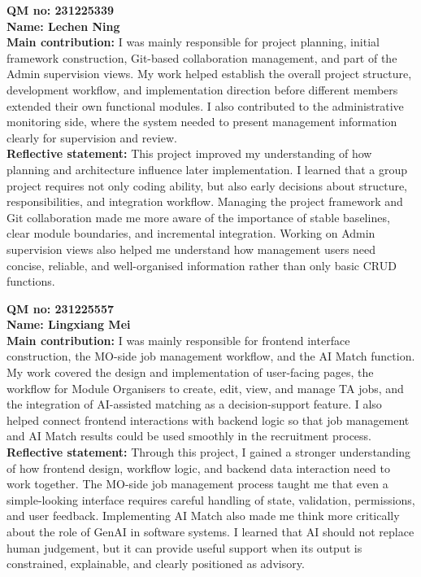 \documentclass[11pt,a4paper]{article}
\begin{document}
{\sloppy

\textbf{QM no: 231225339}\\
\textbf{Name: Lechen Ning}\\
\textbf{Main contribution:} I was mainly responsible for project planning, initial framework construction, Git-based collaboration management, and part of the Admin supervision views. My work helped establish the overall project structure, development workflow, and implementation direction before different members extended their own functional modules. I also contributed to the administrative monitoring side, where the system needed to present management information clearly for supervision and review.\\
\textbf{Reflective statement:} This project improved my understanding of how planning and architecture influence later implementation. I learned that a group project requires not only coding ability, but also early decisions about structure, responsibilities, and integration workflow. Managing the project framework and Git collaboration made me more aware of the importance of stable baselines, clear module boundaries, and incremental integration. Working on Admin supervision views also helped me understand how management users need concise, reliable, and well-organised information rather than only basic CRUD functions.

\vspace{6pt}

\textbf{QM no: 231225557}\\
\textbf{Name: Lingxiang Mei}\\
\textbf{Main contribution:} I was mainly responsible for frontend interface construction, the MO-side job management workflow, and the AI Match function. My work covered the design and implementation of user-facing pages, the workflow for Module Organisers to create, edit, view, and manage TA jobs, and the integration of AI-assisted matching as a decision-support feature. I also helped connect frontend interactions with backend logic so that job management and AI Match results could be used smoothly in the recruitment process.\\
\textbf{Reflective statement:} Through this project, I gained a stronger understanding of how frontend design, workflow logic, and backend data interaction need to work together. The MO-side job management process taught me that even a simple-looking interface requires careful handling of state, validation, permissions, and user feedback. Implementing AI Match also made me think more critically about the role of GenAI in software systems. I learned that AI should not replace human judgement, but it can provide useful support when its output is constrained, explainable, and clearly positioned as advisory.

}
\end{document}
